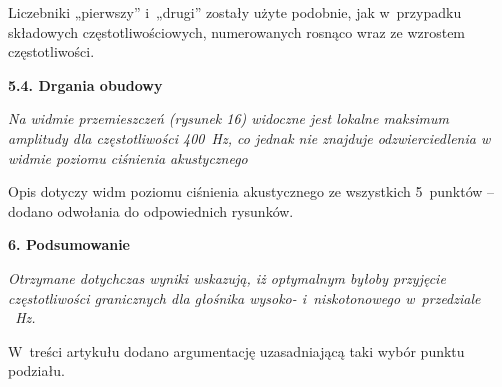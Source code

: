 \documentclass[12pt]{article}
\begin{document}
    Liczebniki „pierwszy” i~„drugi” zostały użyte podobnie, jak w~przypadku składowych częstotliwościowych, numerowanych rosnąco wraz ze wzrostem częstotliwości.
    
    \textbf{5.4. Drgania obudowy}
    
    \textit{Na widmie przemieszczeń (rysunek 16) widoczne jest lokalne maksimum amplitudy dla częstotliwości 400~Hz, co jednak nie znajduje odzwierciedlenia w widmie poziomu ciśnienia akustycznego}
    
    Opis dotyczy widm poziomu ciśnienia akustycznego ze wszystkich 5~punktów -- dodano odwołania do odpowiednich rysunków.
    
    \textbf{6. Podsumowanie}
    
    \textit{Otrzymane dotychczas wyniki wskazują, iż optymalnym byłoby przyjęcie częstotliwości granicznych dla głośnika wysoko- i~niskotonowego w~przedziale ~\si{\hertz}.}
    
    W~treści artykułu dodano argumentację uzasadniającą taki wybór punktu podziału.
    
    
\end{document}

